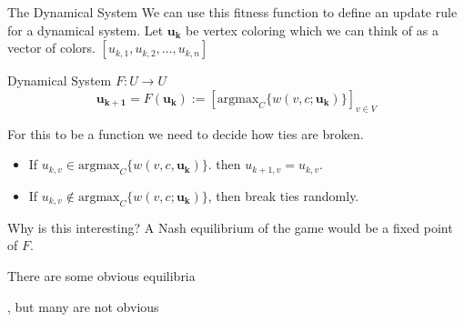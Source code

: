 \documentclass{beamer}
\begin{document}
\begin{frame}{The Dynamical System}
		We can use this fitness function to define an update rule for a dynamical system. Let $\mathbf{u_k}$ be vertex coloring which we can think of as a vector of colors. $[u_{k,1},u_{k,2},...,u_{k,n}]$
	\begin{block}{Dynamical System $F:U\rightarrow U$}
		\begin{equation}
			\mathbf{u_{k+1}}=F(\mathbf{u_k}):=\left[\text{argmax}_{C}\{w(v,c;\mathbf{u_k})\}\right]_{v\in V}
		\end{equation}
	\end{block}
	For this to be a function we need to decide how ties are broken. 
	\begin{itemize} \item If $u_{k,v}\in \text{argmax}_C\{w(v,c,\mathbf{u_k})\}$. then $u_{k+1,v}=u_{k,v}$. \item If $u_{k,v}\notin \text{argmax}_C\{w(v,c;\mathbf{u_k})\}$, then break ties randomly. \end{itemize}
\end{frame}

\begin{frame}{Why is this interesting?}
	A Nash equilibrium of the game would be a fixed point of $F$.
	\vspace{0.5cm}
	 
	\pause 
	\begin{minipage}{0.49\linewidth}
		There are some obvious equilibria 
	
	\end{minipage}\pause
	\begin{minipage}{0.49\linewidth}
	 \raggedright
	 , but many are not obvious
	
	\end{minipage}
	
\end{frame}
\end{document}
